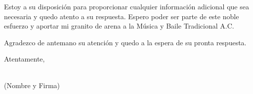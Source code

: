 \documentclass[a4paper,12pt]{letter}
\begin{document}
Estoy a su disposición para proporcionar cualquier información adicional que sea necesaria y quedo atento a su respuesta. Espero poder ser parte de este noble esfuerzo y aportar mi granito de arena a la Música y Baile Tradicional A.C.

Agradezco de antemano su atención y quedo a la espera de su pronta respuesta.

Atentamente,

\vspace{1cm}
\underline{\hspace{10cm}} \hfill  \\
(Nombre y Firma) 
\end{document}
